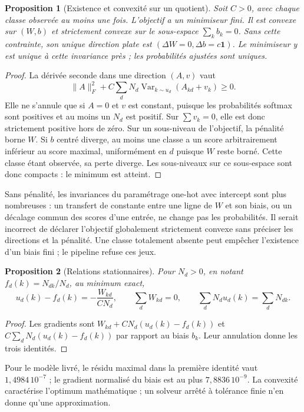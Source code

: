 \documentclass[11pt,a4paper]{article}
\newtheorem{proposition}{Proposition}
\theoremstyle{remark}\newtheorem*{remarque}{Remarque}
\newcommand{\1}{\mathbf 1}
\begin{document}
\begin{proposition}[Existence et convexité sur un quotient]
Soit $C>0$, avec chaque classe observée au moins une fois. L'objectif a un
minimiseur fini. Il est convexe sur $(W,b)$ et strictement convexe sur le
sous-espace $\sum_k b_k=0$. Sans cette contrainte, son unique direction
plate est $(\Delta W=0,\Delta b=c\1)$. Le minimiseur y est unique à cette
invariance près ; les probabilités ajustées sont uniques.
\end{proposition}
\begin{proof}
La dérivée seconde dans une direction $(A,v)$ vaut
\[
 \|A\|_F^2+C\sum_dN_d\operatorname{Var}_{k\sim u_d}(A_{kd}+v_k)\ge0.
\]
Elle ne s'annule que si $A=0$ et $v$ est constant, puisque les probabilités
softmax sont positives et au moins un $N_d$ est positif. Sur $\sum v_k=0$,
elle est donc strictement positive hors de zéro. Sur un sous-niveau de
l'objectif, la pénalité borne $W$. Si $b$ centré diverge, au moins une classe
a un score arbitrairement inférieur au score maximal, uniformément en $d$
puisque $W$ reste borné. Cette classe étant observée, sa perte diverge.
Les sous-niveaux sur ce sous-espace sont donc compacts : le minimum est atteint.
\end{proof}
Sans pénalité, les invariances du paramétrage one-hot avec intercept sont plus
nombreuses : un transfert de constante entre une ligne de $W$ et son biais,
ou un décalage commun des scores d'une entrée, ne change pas les probabilités.
Il serait incorrect de déclarer l'objectif globalement strictement convexe
sans préciser les directions et la pénalité. Une classe totalement absente
peut empêcher l'existence d'un biais fini ; le pipeline refuse ces jeux.

\begin{proposition}[Relations stationnaires]
Pour $N_d>0$, en notant $f_d(k)=N_{dk}/N_d$, au minimum exact,
\[
 u_d(k)-f_d(k)=-\frac{W_{kd}}{CN_d},\qquad
 \sum_d W_{kd}=0,\qquad \sum_dN_du_d(k)=\sum_dN_{dk}.
\]
\end{proposition}
\begin{proof}
Les gradients sont $W_{kd}+CN_d(u_d(k)-f_d(k))$ et
$C\sum_dN_d(u_d(k)-f_d(k))$ par rapport au biais $b_k$.
Leur annulation donne les trois identités.
\end{proof}
Pour le modèle livré, le résidu maximal dans la première identité vaut
$1{,}4984\,10^{-7}$ ; le gradient normalisé du biais est au plus
$7{,}8836\,10^{-9}$. La convexité caractérise l'optimum mathématique ;
un solveur arrêté à tolérance finie n'en donne qu'une approximation.
\end{document}
